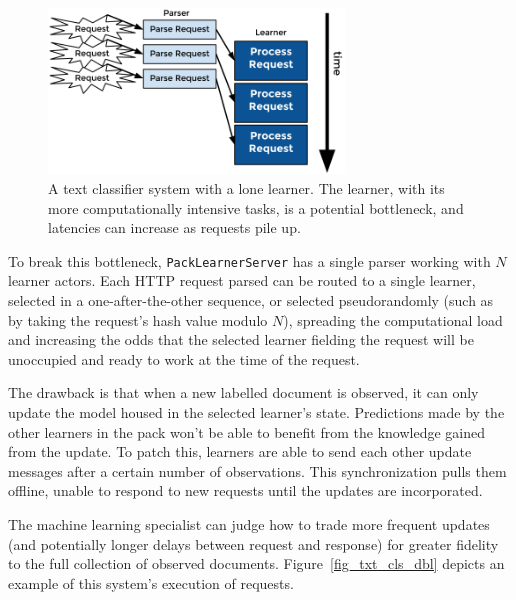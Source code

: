 \documentclass[tablecaption=bottom,wcp]{jmlr}
\begin{document}
\begin{figure}[h]
\includegraphics[width=0.7\textwidth]{fig/tex/single_txt_cls.png}
\centering
\caption{A text classifier system with a lone learner. The learner, with its more
computationally intensive tasks, is a potential bottleneck, and latencies can increase as
requests pile up.}
\label{fig_txt_cls_sng}
\end{figure}

To break this bottleneck, \texttt{PackLearnerServer} has a single parser working
with $N$ learner actors. Each HTTP request parsed can be routed to a single learner,
selected in a one-after-the-other sequence, or selected pseudorandomly (such as by 
taking the request's hash value modulo $N$), spreading the computational load and
increasing the odds that the selected learner fielding the request will be unoccupied and
ready to work at the time of the request. 

The drawback is that when a new labelled document is observed, it can only update
the model housed in the selected learner's state. Predictions made by the other
learners in the pack won't be able to benefit from the knowledge gained from the 
update. To patch this, learners are able to send each other update messages
after a certain number of observations. This synchronization pulls them offline, unable
to respond to new requests until the updates are incorporated. 

The machine learning specialist can judge how to trade more frequent updates (and 
potentially longer delays between request and response) for greater fidelity to the full 
collection of observed documents. Figure~\ref{fig_txt_cls_dbl} depicts an example of 
this system's execution of requests.
\end{document}

